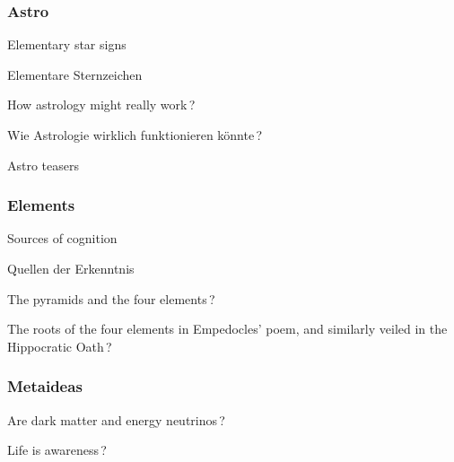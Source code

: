 \subsubsection*{Astro}
\begin{list}{}{\setlength{\leftmargin}{13pt}}
\item[\ipdfen] Elementary star signs
\vspace{-1.4mm}
\item[\ipdfde] Elementare Sternzeichen
%
\item[\ipdfen] How astrology might really work\,?
\vspace{-1.4mm}
\item[\ipdfde] Wie Astrologie wirklich funktionieren könnte\,?
%
\item[\ipdfen] Astro teasers
\end{list}

\subsubsection*{Elements}
\begin{list}{}{\setlength{\leftmargin}{13pt}}
\item[\ipdfen] Sources of cognition
\vspace{-1.4mm}
\item[\ipdfde] Quellen der Erkenntnis
%
\item[\ipdfen] The pyramids and the four elements\,?
%
\vspace{-1.0mm}
\item[\ipdfen]
The roots of the four elements in Empedocles’ poem,\newline
and similarly veiled in the Hippocratic Oath\,?
\end{list}

\subsubsection*{Metaideas}
\begin{list}{}{\setlength{\leftmargin}{13pt}}
\item[\ipdfen] Are dark matter and energy neutrinos\,?
\vspace{-1.4mm}
\item[\ipdfblueen] {\color{odyssey}Life is awareness\,?}
\end{list}

